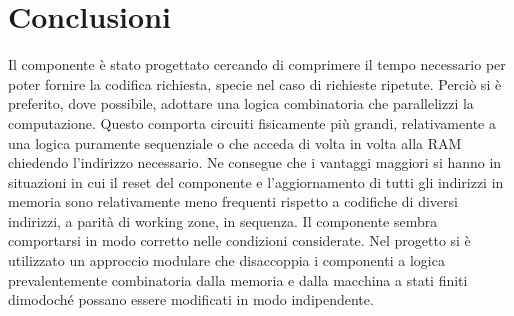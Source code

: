 \documentclass [a4paper, 12pt]{article}
\begin{document}
\newpage
\section{Conclusioni}
Il componente \`e stato progettato cercando di comprimere il tempo 
necessario per poter fornire la codifica richiesta, specie nel caso di 
richieste ripetute. Perci\`o si \`e preferito, dove possibile, adottare
 una logica combinatoria che parallelizzi la computazione. Questo comporta
 circuiti fisicamente pi\`u grandi, relativamente a una logica puramente 
sequenziale o che acceda di volta in volta alla RAM chiedendo l'indirizzo necessario. 
Ne consegue che i vantaggi maggiori si hanno in situazioni in cui il reset del componente
 e l'aggiornamento di tutti gli indirizzi in memoria sono relativamente meno frequenti rispetto 
a codifiche di diversi indirizzi, a parit\`a di working zone, in sequenza. Il componente sembra 
comportarsi in modo corretto nelle condizioni considerate. Nel progetto si \`e utilizzato un approccio modulare che disaccoppia i componenti a logica prevalentemente combinatoria dalla memoria e dalla macchina a stati finiti dimodoch\'e possano essere modificati in modo indipendente.
\end{document}
